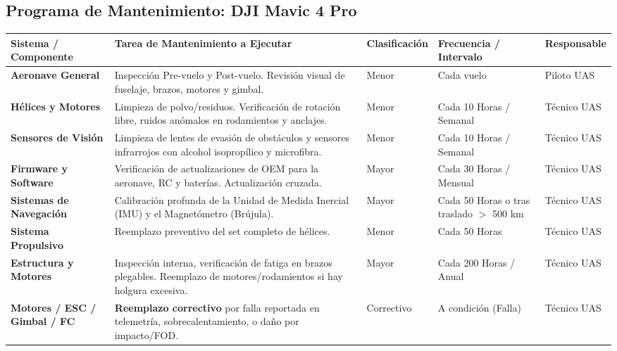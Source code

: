 \subsection{Programa de Mantenimiento: DJI Mavic 4 Pro}

\begin{longtable}{|p{}|p{}|m{}|p{}|p{}|}
\hline
\rowcolor{gray!30} %
\textbf{Sistema / Componente} & \textbf{Tarea de Mantenimiento a Ejecutar} & \textbf{Clasificación} & \textbf{Frecuencia / Intervalo} & \textbf{Responsable} \\ \hline
\endhead

\textbf{Aeronave General} & Inspección Pre-vuelo y Post-vuelo. Revisión visual de fuselaje, brazos, motores y gimbal. & Menor & Cada vuelo & Piloto UAS \\ \hline

\textbf{Hélices y Motores} & Limpieza de polvo/residuos. Verificación de rotación libre, ruidos anómalos en rodamientos y anclajes. & Menor & Cada 10 Horas / Semanal & Técnico UAS \\ \hline

\textbf{Sensores de Visión} & Limpieza de lentes de evasión de obstáculos y sensores infrarrojos con alcohol isopropílico y microfibra. & Menor & Cada 10 Horas / Semanal & Técnico UAS \\ \hline

\textbf{Firmware y Software} & Verificación de actualizaciones de OEM para la aeronave, RC y baterías. Actualización cruzada. & Mayor & Cada 30 Horas / Mensual & Técnico UAS \\ \hline

\textbf{Sistemas de Navegación} & Calibración profunda de la Unidad de Medida Inercial (IMU) y el Magnetómetro (Brújula). & Mayor & Cada 50 Horas o tras traslado $>$ 500 km & Técnico UAS \\ \hline

\textbf{Sistema Propulsivo} & Reemplazo preventivo del set completo de hélices. & Menor & Cada 50 Horas & Técnico UAS \\ \hline

\textbf{Estructura y Motores} & Inspección interna, verificación de fatiga en brazos plegables. Reemplazo de motores/rodamientos si hay holgura excesiva. & Mayor & Cada 200 Horas / Anual & Técnico UAS \\ \hline

\textbf{Motores / ESC / Gimbal / FC} & \textbf{Reemplazo correctivo} por falla reportada en telemetría, sobrecalentamiento, o daño por impacto/FOD. & Correctivo & A condición (Falla) & Técnico UAS \\ \hline
\end{longtable}



